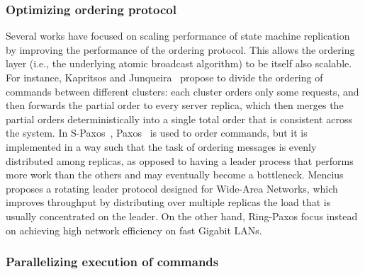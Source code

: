 \subsubsection{Optimizing ordering protocol}

Several works have focused on scaling performance of state machine replication
by improving the performance of the ordering protocol. This allows the ordering
layer (i.e., the underlying atomic broadcast algorithm) to be itself also
scalable. For instance, Kapritsos and Junqueira~\cite{kapritsos2010scalable}
propose to divide the ordering of commands between different clusters: each
cluster orders only some requests, and then forwards the partial order to every
server replica, which then merges the partial orders deterministically into a
single total order that is consistent across the system. In
S-Paxos~\cite{biely2012spaxos}, Paxos~\cite{Lam98} is used to order commands,
but it is implemented in a way such that the task of ordering messages is evenly
distributed among replicas, as opposed to having a leader process that performs
more work than the others and may eventually become a bottleneck. Mencius
\cite{Mencius} proposes a rotating leader protocol designed for Wide-Area
Networks, which improves throughput by distributing over multiple replicas the
load that is usually concentrated on the leader. On the other hand, Ring-Paxos
\cite{Marandi:2012hb} focus instead on achieving high network efficiency on fast
Gigabit LANs. 

\subsubsection{Parallelizing execution of commands}

